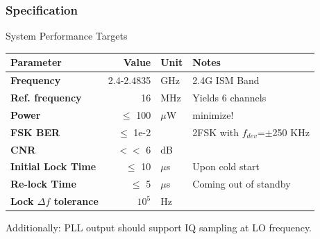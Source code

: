 \documentclass[t, screen, aspectratio=43]{beamer}
\begin{document}
\begin{frame}
	\frametitle{Specification\color{black}}
	\begin{block}{System Performance Targets}
		\scriptsize
		\begin{table}[h!]
			\centering
			\def\arraystretch{1.5}		
			\setlength\arrayrulewidth{0.75pt}
			\setlength{\tabcolsep}{1em} %
			\begin{tabular}{|l|r|l|l|}
				\hline 
				\rule[-1ex]{0pt}{2.5ex} \cellcolor{gray!40}\textbf{Parameter} & \cellcolor{gray!40}\textbf{Value} & \cellcolor{gray!40}\textbf{Unit }& \cellcolor{gray!40}\textbf{Notes}\\ 
				\hline 
				\rule[-1ex]{0pt}{2.5ex} \textbf{Frequency}  & 2.4-2.4835 & GHz & 2.4G ISM Band\\ 
				\hline 
				\rule[-1ex]{0pt}{2.5ex} \textbf{Ref. frequency} & 16 & MHz & Yields 6 channels \\ 
				\hline 
				\rule[-1ex]{0pt}{2.5ex} \textbf{Power} & $\leq$ 100  &$\mu$W & minimize!\\ 
				\hline 
				\rule[-1ex]{0pt}{2.5ex} \textbf{FSK BER} & $\leq$ 1e-2  & & 2FSK with $f_{dev}$=$\pm$250 KHz\\ 
				\hline 
				\rule[-1ex]{0pt}{2.5ex} \cellcolor{yellow}\textbf{CNR} &\cellcolor{yellow} $<<$\cellcolor{yellow} 6 &\cellcolor{yellow} dB&\cellcolor{yellow} \\ 
				\hline 
				\rule[-1ex]{0pt}{2.5ex} \textbf{Initial Lock Time} & $\leq$ 10 & $\mu$s & Upon cold start \\ 
				\hline 
				\rule[-1ex]{0pt}{2.5ex} \textbf{Re-lock Time} & $\leq$ 5 & $\mu$s & Coming out of standby \\ 
				\hline 
				\rule[-1ex]{0pt}{2.5ex} \textbf{Lock $\Delta f$ tolerance} & $10^5$ & Hz& \\ 
				\hline 
			\end{tabular} 
		\end{table}   
		Additionally: PLL output should support IQ sampling at LO frequency.
	\end{block}    
\end{frame}
\end{document}
